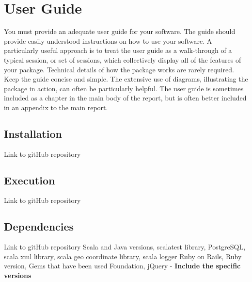 \chapter{User Guide}
You must provide an adequate user guide for your software. The guide should provide easily understood instructions on how to use your software. A particularly useful approach is to treat the user guide as a walk-through of a typical session, or set of sessions, which collectively display all of the features of your package. Technical details of how the package works are rarely required. Keep the guide concise and simple. The extensive use of diagrams, illustrating the package in action, can often be particularly helpful. The user guide is sometimes included as a chapter in the main body of the report, but is often better included in an appendix to the main report.
\section{Installation}
Link to gitHub repository
\section{Execution}
Link to gitHub repository
\section{Dependencies}
Link to gitHub repository
Scala and Java versions, scalatest library, PostgreSQL, scala xml library, scala geo coordinate library, scala logger
Ruby on Rails, Ruby version, Gems that have been used
Foundation, jQuery - \textbf{Include the specific versions}